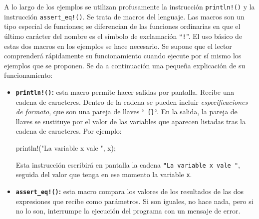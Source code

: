 A lo largo de los ejemplos se utilizan profusamente la instrucción \texttt{println!()} y la instrucción  \texttt{assert\_eq!()}. Se trata de macros del lenguaje. Las macros son un tipo especial de funciones; se diferencian de las funciones ordinarias en que el último carácter del nombre es el símbolo de exclamación ``\texttt{!}''. El uso básico de estas dos macros en los ejemplos se hace necesario. Se supone que el lector comprenderá rápidamente su funcionamiento cuando ejecute por sí mismo los ejemplos que se proponen. Se da a continuación una pequeña explicación de su funcionamiento:

\begin{itemize}
   \item \textbf{\texttt{println!()}:} esta macro permite hacer salidas por pantalla.
   Recibe una cadena de caracteres. Dentro de la cadena se pueden incluir \textit{especificaciones de formato}, que son una pareja de llaves `` \texttt{\{\}}``. En la salida, la pareja de llaves se sustituye por el valor de las variables que aparecen listadas tras la cadena de caracteres. Por ejemplo:
   
   \begin{Codigo}
      println!("La variable x vale {}", x);
   \end{Codigo}
   
   \vspace{0.8em}
   Esta instrucción escribirá en pantalla la cadena \texttt{"La variable x vale "}, seguida del valor que tenga en ese momento la variable \texttt{x}.
   
   \item \textbf{\texttt{assert\_eq!()}:} esta macro compara los valores de los resultados de las dos expresiones que recibe como parámetros. Si son iguales, no hace nada, pero si no lo son, interrumpe la ejecución del programa con un mensaje de error.
\end{itemize}

